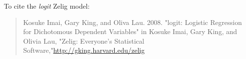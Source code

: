 To cite the \emph{ logit } Zelig model:
 \begin{verse}
 Kosuke Imai, Gary King, and Oliva Lau. 2008. "logit: Logistic Regression for Dichotomous Dependent Variables" in Kosuke Imai, Gary King, and Olivia Lau, "Zelig: Everyone's Statistical Software,"\url{http://gking.harvard.edu/zelig} 
\end{verse}